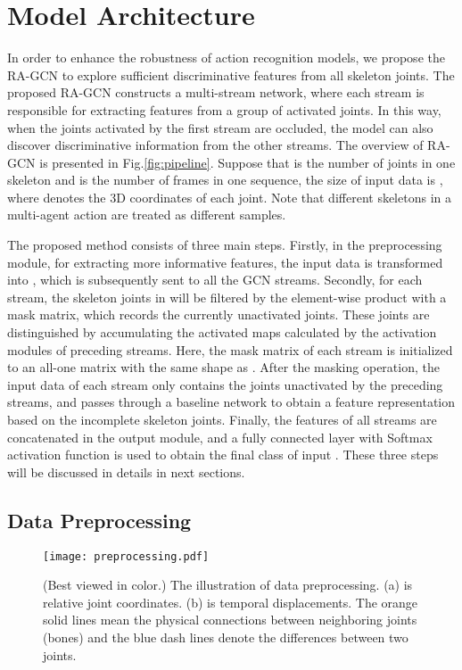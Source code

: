 \documentclass[journal]{IEEEtran}
\begin{document}
\section{Model Architecture}
\label{sec:model}

In order to enhance the robustness of action recognition models, we propose the RA-GCN to explore sufficient discriminative features from all skeleton joints. The proposed RA-GCN constructs a multi-stream network, where each stream is responsible for extracting features from a group of activated joints. In this way, when the joints activated by the first stream are occluded, the model can also discover discriminative information from the other streams. The overview of RA-GCN is presented in Fig.\ref{fig:pipeline}. Suppose that  is the number of joints in one skeleton and  is the number of frames in one sequence, the size of input data  is , where  denotes the 3D coordinates of each joint. Note that different skeletons in a multi-agent action are treated as different samples.

The proposed method consists of three main steps. Firstly, in the preprocessing module, for extracting more informative features, the input data  is transformed into , which is subsequently sent to all the GCN streams. Secondly, for each stream, the skeleton joints in  will be filtered by the element-wise product with a mask matrix, which records the currently unactivated joints. These joints are distinguished by accumulating the activated maps calculated by the activation modules of preceding streams. Here, the mask matrix of each stream is initialized to an all-one matrix with the same shape as . After the masking operation, the input data of each stream only contains the joints unactivated by the preceding streams, and passes through a baseline network to obtain a feature representation based on the incomplete skeleton joints. Finally, the features of all streams are concatenated in the output module, and a fully connected layer with Softmax activation function is used to obtain the final class of input . These three steps will be discussed in details in next sections.

\subsection{Data Preprocessing}
\label{ssec:preprocessing}

\begin{figure}[t]
    \centering
    \texttt{[image: preprocessing.pdf]}
    \caption{(Best viewed in color.) The illustration of data preprocessing. (a) is relative joint coordinates. (b) is temporal displacements. The {\color{orange}orange} solid lines mean the physical connections between neighboring joints (bones) and the {\color{blue}blue} dash lines denote the differences between two joints.}
    \label{fig:preprocessing}
\end{figure}
\end{document}

